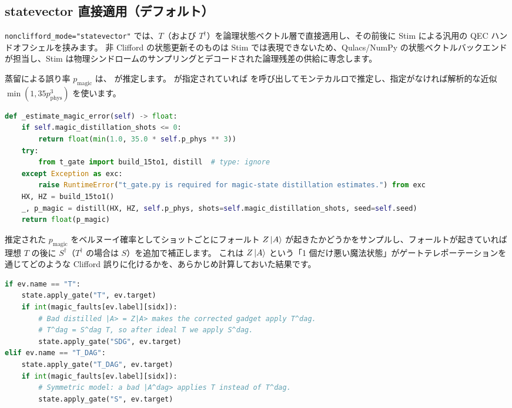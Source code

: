 \subsection{statevector 直接適用（デフォルト）}

\texttt{nonclifford\_mode="statevector"} では、$T$（および $T^\dagger$）を論理状態ベクトル層で直接適用し、その前後に Stim による汎用の QEC ハンドオフシェルを挟みます。
非 Clifford の状態更新そのものは Stim では表現できないため、Qulacs/NumPy の状態ベクトルバックエンドが担当し、Stim は物理シンドロームのサンプリングとデコードされた論理残差の供給に専念します。

蒸留による誤り率 $p_{\mathrm{magic}}$ は、 が推定します。
 が指定されていれば  を呼び出してモンテカルロで推定し、指定がなければ解析的な近似 $\min(1, 35p_{\mathrm{phys}}^3)$ を使います。

\begin{lstlisting}[language=Python, caption={蒸留誤りの推定（src/stages/01\_mpp/src/ftqc/hybrid\_ftqc\_runtime.py）}]
def _estimate_magic_error(self) -> float:
    if self.magic_distillation_shots <= 0:
        return float(min(1.0, 35.0 * self.p_phys ** 3))
    try:
        from t_gate import build_15to1, distill  # type: ignore
    except Exception as exc:
        raise RuntimeError("t_gate.py is required for magic-state distillation estimates.") from exc
    HX, HZ = build_15to1()
    _, p_magic = distill(HX, HZ, self.p_phys, shots=self.magic_distillation_shots, seed=self.seed)
    return float(p_magic)
\end{lstlisting}

推定された $p_{\mathrm{magic}}$ をベルヌーイ確率としてショットごとにフォールト $Z\ket{A}$ が起きたかどうかをサンプルし、フォールトが起きていれば理想 $T$ の後に $S^\dagger$（$T^\dagger$ の場合は $S$）を追加で補正します。
これは $Z\ket{A}$ という「1 個だけ悪い魔法状態」がゲートテレポーテーションを通じてどのような Clifford 誤りに化けるかを、あらかじめ計算しておいた結果です。

\begin{lstlisting}[language=Python, caption={statevector 経路での磁法状態フォールト適用（src/stages/01\_mpp/src/ftqc/hybrid\_ftqc\_runtime.py）}]
if ev.name == "T":
    state.apply_gate("T", ev.target)
    if int(magic_faults[ev.label][sidx]):
        # Bad distilled |A> = Z|A> makes the corrected gadget apply T^dag.
        # T^dag = S^dag T, so after ideal T we apply S^dag.
        state.apply_gate("SDG", ev.target)
elif ev.name == "T_DAG":
    state.apply_gate("T_DAG", ev.target)
    if int(magic_faults[ev.label][sidx]):
        # Symmetric model: a bad |A^dag> applies T instead of T^dag.
        state.apply_gate("S", ev.target)
\end{lstlisting}

